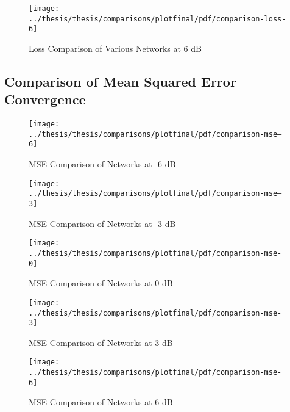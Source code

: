 \begin{figure}[!ht]
\centering
\texttt{[image: ../thesis/thesis/comparisons/plotfinal/pdf/comparison-loss-6]}
\caption{Loss Comparison of Various Networks at 6 dB}
\end{figure}



\subsection{Comparison of Mean Squared Error Convergence}

\begin{figure}[!ht]
\centering
\texttt{[image: ../thesis/thesis/comparisons/plotfinal/pdf/comparison-mse--6]}
\caption{MSE Comparison of Networks at -6 dB}
\end{figure}

\begin{figure}[!ht]
\centering
\texttt{[image: ../thesis/thesis/comparisons/plotfinal/pdf/comparison-mse--3]}
\caption{MSE Comparison of Networks at -3 dB}
\end{figure}

\begin{figure}[!ht]
\centering
\texttt{[image: ../thesis/thesis/comparisons/plotfinal/pdf/comparison-mse-0]}
\caption{MSE Comparison of Networks at 0 dB}
\end{figure}

\begin{figure}[!ht]
\centering
\texttt{[image: ../thesis/thesis/comparisons/plotfinal/pdf/comparison-mse-3]}
\caption{MSE Comparison of Networks at 3 dB}
\end{figure}

\begin{figure}[!ht]
\centering
\texttt{[image: ../thesis/thesis/comparisons/plotfinal/pdf/comparison-mse-6]}
\caption{MSE Comparison of Networks at 6 dB}
\end{figure}

